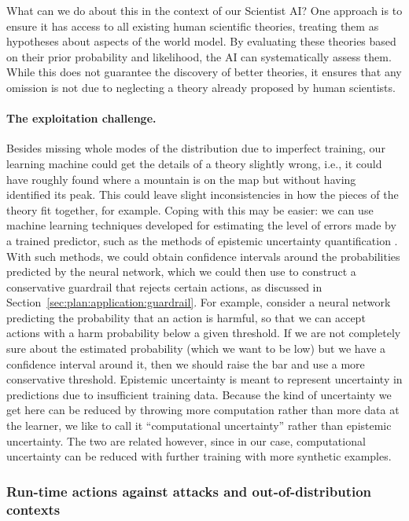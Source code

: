 What can we do about this in the context of our Scientist AI? One approach is to ensure it has access to all existing human scientific theories, treating them as hypotheses about aspects of the world model. By evaluating these theories based on their prior probability and likelihood, the AI can systematically assess them. While this does not guarantee the discovery of better theories, it ensures that any omission is not due to neglecting a theory already proposed by human scientists.

\paragraph{The exploitation challenge.} Besides missing whole modes of the distribution due to imperfect training, our learning machine could get the details of a theory slightly wrong, i.e., it could have roughly found where a mountain is on the map but without having identified its peak. This could leave slight inconsistencies in how the pieces of the theory fit together, for example. Coping with this may be easier: we can use machine learning techniques developed for estimating the level of errors made by a trained predictor, such as the methods of epistemic uncertainty quantification \cite{dl.acm.org.doi.10.1561.2200000101}. With such methods, we could obtain confidence intervals around the probabilities predicted by the neural network, which we could then use to construct a conservative guardrail that rejects certain actions, as discussed in Section~\ref{sec:plan:application:guardrail}. For example, consider a neural network predicting the probability that an action is harmful, so that we can accept actions with a harm probability below a given threshold. If we are not completely sure about the estimated probability (which we want to be low) but we have a confidence interval around it, then we should raise the bar and use a more conservative threshold. Epistemic uncertainty is meant to represent uncertainty in predictions due to insufficient training data. Because the kind of uncertainty we get here can be reduced by throwing more computation rather than more data at the learner, we like to call it ``computational uncertainty'' rather than epistemic uncertainty. The two are related however, since in our case, computational uncertainty can be reduced with further training with more synthetic examples.    
    
\subsubsection{Run-time actions against attacks and out-of-distribution contexts}
\label{sec:plan:inferencemachine:runtimeactions}

